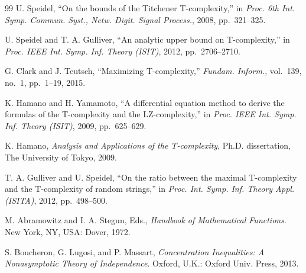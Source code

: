 \documentclass[journal]{IEEEtran}
\theoremstyle{plain}
\theoremstyle{definition}
\theoremstyle{remark}
\begin{document}
\begin{thebibliography}{99}
U. Speidel,
``On the bounds of the Titchener T-complexity,''
in \emph{Proc. 6th Int. Symp. Commun. Syst., Netw. Digit. Signal Process.}, 2008, pp.~321--325.

U. Speidel and T. A. Gulliver,
``An analytic upper bound on T-complexity,''
in \emph{Proc. IEEE Int. Symp. Inf. Theory (ISIT)}, 2012, pp.~2706--2710.

G. Clark and J. Teutsch,
``Maximizing T-complexity,''
\emph{Fundam. Inform.}, vol.~139, no.~1, pp.~1--19, 2015.

K. Hamano and H. Yamamoto,
``A differential equation method to derive the formulas of the T-complexity and the LZ-complexity,''
in \emph{Proc. IEEE Int. Symp. Inf. Theory (ISIT)}, 2009, pp.~625--629.

K. Hamano,
\emph{Analysis and Applications of the T-complexity},
Ph.D. dissertation, The University of Tokyo, 2009.

T. A. Gulliver and U. Speidel,
``On the ratio between the maximal T-complexity and the T-complexity of random strings,''
in \emph{Proc. Int. Symp. Inf. Theory Appl. (ISITA)}, 2012, pp.~498--500.

M. Abramowitz and I. A. Stegun, Eds.,
\emph{Handbook of Mathematical Functions}.
New York, NY, USA: Dover, 1972.

S. Boucheron, G. Lugosi, and P. Massart,
\emph{Concentration Inequalities: A Nonasymptotic Theory of Independence}.
Oxford, U.K.: Oxford Univ. Press, 2013.

\end{thebibliography}
\end{document}

